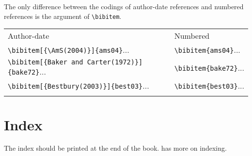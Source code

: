 The only difference between the codings of author-date references
and numbered references is the argument of \verb|\bibitem|.

{\centering
\begin{tabular}{@{}ll@{}}\toprule
Author-date & Numbered\\\colrule
\verb|\bibitem[{\AmS(2004)}]{ams04}|...&\verb|\bibitem{ams04}|...\\
\verb|\bibitem[{Baker and Carter(1972)}]{bake72}|...&\verb|\bibitem{bake72}|...\\
\verb|\bibitem[{Bestbury(2003)}]{best03}|...&\verb|\bibitem{best03}|...\\
\botrule
\end{tabular}}

\section{Index}
The index should be printed at the end of the book.  has more
on indexing.
